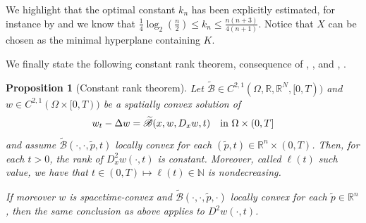 \documentclass[11pt, reqno]{amsart}
\newtheorem{proposition}[lemma]{Proposition}
\theoremstyle{definition}
\numberwithin{equation}{section}
\newcommand{\Btilde}{\widetilde{\mathscr{B}}}
\newcommand{\R}{\mathbb{R}}
\newcommand{\N}{\mathbb{N}}
\newcommand{\tr}[1]{{\color{red} #1}}
\begin{document}
We highlight that the optimal constant $k_n$ has been explicitly estimated, for instance by \cite{ulam} and \cite{Lac99} we know that $ \frac{1}{4}\log_2(\frac{n}{2}) \leq k_n \leq \frac{n(n+3)}{4(n+1)}$. 
Notice that $X$ can be chosen as the minimal hyperplane containing $K$.

\medskip

We finally state the following constant rank theorem, consequence of \cite[Theorem 1.5]{CaffareliGuanMa2007}, \cite[Theorem 1.2]{BianGuan2009}, and \cite[Theorem 1.3]{chen2014}, \cite[Theorem 1.3]{ChenHu2013}. %

\begin{proposition}[Constant rank theorem]
\label{prop_const_rank}
Let $\Btilde \in C^{2,1}(\Omega, \R, \R^N, [0,T))$ and $w\in C^{2,1}(\Omega\times[0,T))$
be a spatially convex solution of
\begin{equation}\label{eq_const_rank}
w_t - \Delta w = \Btilde(x,w,D_x w, t) \quad \hbox{in $\Omega \times (0,T]$}
\end{equation}
and assume $\Btilde(\cdot, \cdot, \tilde{p}, t)$ locally convex 
for each $(\tilde{p},t) \in \R^n \times (0, T)$. Then, for each $t>0$, the rank of $D^2_x w(\cdot, t)$ is constant. Moreover, called $\ell(t)$ such value, we have that $t \in (0,T) %
 \mapsto \ell(t) \in \N$ is nondecreasing.

If moreover %
$w$ is spacetime-convex and $\Btilde(\cdot, \cdot, \tilde{p}, \cdot)$ locally convex for each $\tilde{p} \in \R^n$, then the same conclusion as above applies to $D^2 w(\cdot, t)$. %
\end{proposition}
\end{document}
